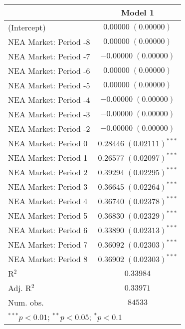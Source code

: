 
\begin{tabular}{l c}
\hline
 & Model 1 \\
\hline
(Intercept)           & $0.00000 \; (0.00000)$       \\
NEA Market: Period -8 & $0.00000 \; (0.00000)$       \\
NEA Market: Period -7 & $-0.00000 \; (0.00000)$      \\
NEA Market: Period -6 & $0.00000 \; (0.00000)$       \\
NEA Market: Period -5 & $0.00000 \; (0.00000)$       \\
NEA Market: Period -4 & $-0.00000 \; (0.00000)$      \\
NEA Market: Period -3 & $-0.00000 \; (0.00000)$      \\
NEA Market: Period -2 & $-0.00000 \; (0.00000)$      \\
NEA Market: Period 0  & $0.28446 \; (0.02111)^{***}$ \\
NEA Market: Period 1  & $0.26577 \; (0.02097)^{***}$ \\
NEA Market: Period 2  & $0.39294 \; (0.02295)^{***}$ \\
NEA Market: Period 3  & $0.36645 \; (0.02264)^{***}$ \\
NEA Market: Period 4  & $0.36740 \; (0.02378)^{***}$ \\
NEA Market: Period 5  & $0.36830 \; (0.02329)^{***}$ \\
NEA Market: Period 6  & $0.33890 \; (0.02313)^{***}$ \\
NEA Market: Period 7  & $0.36092 \; (0.02303)^{***}$ \\
NEA Market: Period 8  & $0.36902 \; (0.02303)^{***}$ \\
\hline
R$^2$                 & $0.33984$                    \\
Adj. R$^2$            & $0.33971$                    \\
Num. obs.             & $84533$                      \\
\hline
\multicolumn{2}{l}{\scriptsize{$^{***}p<0.01$; $^{**}p<0.05$; $^{*}p<0.1$}}
\end{tabular}
